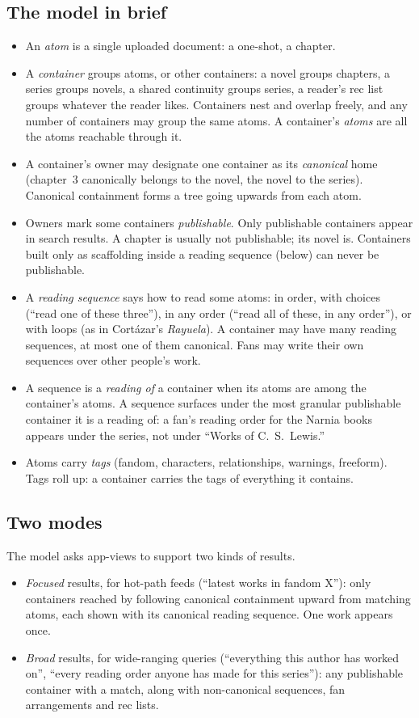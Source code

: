 \documentclass{amsart}
\theoremstyle{remark}
\begin{document}
\subsection{The model in brief}
\begin{itemize}
\item An \emph{atom} is a single uploaded document: a one-shot, a chapter.
\item A \emph{container} groups atoms, or other containers: a novel groups chapters, a series groups novels, a shared continuity groups series, a reader's rec list groups whatever the reader likes. Containers nest and overlap freely, and any number of containers may group the same atoms. A container's \emph{atoms} are all the atoms reachable through it.
\item A container's owner may designate one container as its \emph{canonical} home (chapter~3 canonically belongs to the novel, the novel to the series). Canonical containment forms a tree going upwards from each atom.
\item Owners mark some containers \emph{publishable}. Only publishable containers appear in search results. A chapter is usually not publishable; its novel is. Containers built only as scaffolding inside a reading sequence (below) can never be publishable.
\item A \emph{reading sequence} says how to read some atoms: in order, with choices (``read one of these three''), in any order (``read all of these, in any order''), or with loops (as in Cort\'azar's \emph{Rayuela}). A container may have many reading sequences, at most one of them canonical. Fans may write their own sequences over other people's work.
\item A sequence is a \emph{reading of} a container when its atoms are among the container's atoms. A sequence surfaces under the most granular publishable container it is a reading of: a fan's reading order for the Narnia books appears under the series, not under ``Works of C.~S.~Lewis.''
\item Atoms carry \emph{tags} (fandom, characters, relationships, warnings, freeform). Tags roll up: a container carries the tags of everything it contains.
\end{itemize}

\subsection{Two modes}
The model asks app-views to support two kinds of results.
\begin{itemize}
\item \emph{Focused} results, for hot-path feeds (``latest works in fandom X''): only containers reached by following canonical containment upward from matching atoms, each shown with its canonical reading sequence. One work appears once.
\item \emph{Broad} results, for wide-ranging queries (``everything this author has worked on'', ``every reading order anyone has made for this series''): any publishable container with a match, along with non-canonical sequences, fan arrangements and rec lists.
\end{itemize}
\end{document}
